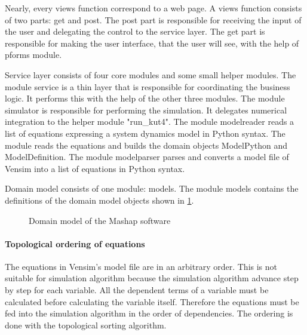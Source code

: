 \documentclass[12pt,a4paper]{paper}
\begin{document}
Nearly, every views function correspond to a web page. A views function consists of two parts: get and post. The post part is responsible for receiving the input of the user and delegating the control to the service layer. The get part is responsible for making the user interface, that the user will see, with the help of pforms module.

Service layer consists of four core modules and some small helper modules. The module service is a thin layer that is responsible for coordinating the business logic. It performs this with the help of the other three modules. The module simulator is responsible for performing the simulation. It delegates numerical integration to the helper module "run\_kut4". The module modelreader reads a list of equations expressing a system dynamics model in Python syntax. The module reads the equations and builds the domain objects ModelPython and ModelDefinition. The module modelparser parses and converts a model file of Vensim into a list of equations in Python syntax.

Domain model consists of one module: models. The module models contains the definitions of the domain model objects shown in \ref{fig:domain_model}. \\

\begin{figure}
	\centering
\caption{Domain model of the Mashap software}%
\label{fig:domain_model}%
\end{figure}

\paragraph{Topological ordering of equations}
The equations in Vensim's model file are in an arbitrary order. This is not suitable for simulation algorithm because the simulation algorithm advance step by step for each variable. All the dependent terms of a variable must be calculated before calculating the variable itself. Therefore the equations must be fed into the simulation algorithm in the order of dependencies. The ordering is done with the topological sorting algorithm. 
\end{document}
